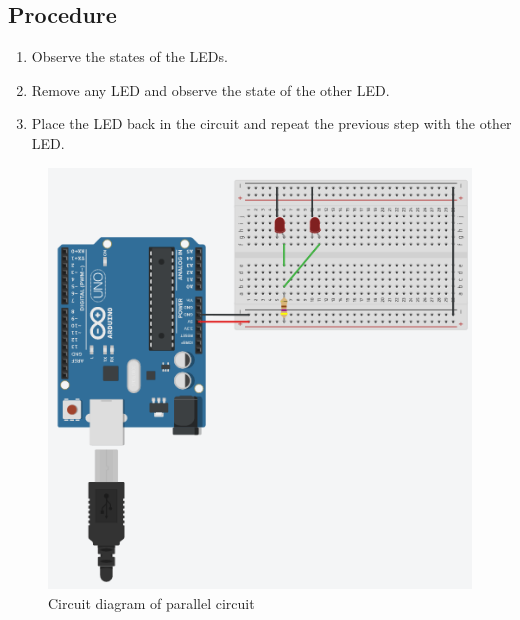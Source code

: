 \subsection*{Procedure}
\begin{enumerate}[leftmargin=*]
    \item Observe the states of the LEDs.
    \item Remove any LED and observe the state of the other LED.
    \item Place the LED back in the circuit and repeat the previous step with the other LED.
\end{enumerate}
\begin{figure}[H]
    \centering
    \includegraphics[scale=0.6]{Figures/electricity-parallel.PNG}
    \caption{Circuit diagram of parallel circuit}
    \label{fig:elec-p}
\end{figure}
\vfill